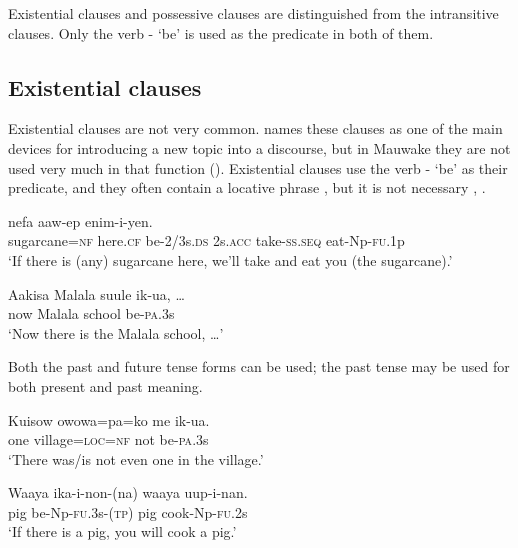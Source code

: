 Existential clauses and possessive clauses are distinguished from the intransitive clauses. Only the verb - `be' is used as the predicate in both of them. 

\subsection{Existential clauses} \label{5.5.1}

Existential clauses are not very common. \citet[741]{Givon1990} names these clauses as one of the main devices for introducing a new topic into a discourse, but in Mauwake they are not used very much in that function (). Existential clauses use the verb - `be' as their predicate, and they often contain a locative phrase , but it is not necessary , . 

\ea%
\label{ex:5:x970}
\gll {}     nefa  aaw-ep  enim-i-yen. \\
     sugarcane=\textsc{nf}  here.\textsc{cf}  be-2/3s.\textsc{ds}  2s.\textsc{acc}  take-\textsc{ss}.\textsc{seq}  eat-Np-\textsc{fu}.1p \\
\glt `If there is (any) sugarcane here, we'll take and eat you (the sugarcane).'
\z

\ea%
\label{ex:5:x971}
\gll Aakisa  Malala  suule  ik-ua,  {\dots} \\
     now  Malala  school  be-\textsc{pa}.3s \\
\glt `Now there is the Malala school, {\dots}'
\z

Both the past and future tense forms can be used; the past tense may be used for both present and past meaning. 

\ea%
\label{ex:5:x1068}
\gll Kuisow  owowa=pa=ko  me  ik-ua. \\
     one  village=\textsc{loc}=\textsc{nf}  not  be-\textsc{pa}.3s \\
\glt `There was/is not even one in the village.'
\z

\ea%
\label{ex:5:x1067}
\gll Waaya  ika-i-non-(na)  waaya  uup-i-nan. \\
     pig  be-Np-\textsc{fu}.3s-(\textsc{tp})  pig  cook-Np-\textsc{fu}.2s \\
\glt `If there is a pig, you will cook a pig.'
\z

